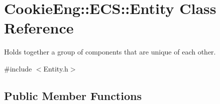 \hypertarget{class_cookie_eng_1_1_e_c_s_1_1_entity}{}\section{Cookie\+Eng\+:\+:E\+CS\+:\+:Entity Class Reference}
\label{class_cookie_eng_1_1_e_c_s_1_1_entity}


Holds together a group of components that are unique of each other.  




{\ttfamily \#include $<$Entity.\+h$>$}

\subsection*{Public Member Functions}

